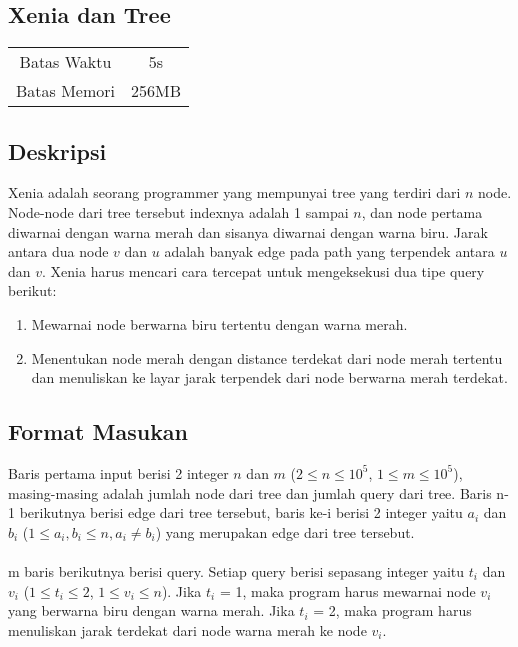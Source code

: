 \documentclass{article}
\begin{document}
\begin{center}

    
    \section*{Xenia dan Tree} %

    \begin{tabular}{ | c c | }
        \hline
        Batas Waktu  & 5s \\    %
        Batas Memori & 256MB \\  %
        \hline
    \end{tabular}
\end{center}

\subsection*{Deskripsi}
Xenia adalah seorang programmer yang mempunyai tree yang terdiri dari $n$ node. Node-node dari tree tersebut indexnya adalah 1 sampai $n$, dan node pertama diwarnai dengan warna merah dan sisanya diwarnai dengan warna biru. Jarak antara dua node $v$ dan $u$ adalah banyak edge pada path yang terpendek antara $u$ dan $v$.
Xenia harus mencari cara tercepat untuk mengeksekusi dua tipe query berikut:
\begin{enumerate}
    \setlength\itemsep{0pt}
    \item Mewarnai node berwarna biru tertentu dengan warna merah.
    \item Menentukan node merah dengan distance terdekat dari node merah tertentu dan menuliskan ke layar jarak terpendek dari node berwarna merah terdekat.
\end{enumerate}
\subsection*{Format Masukan}
Baris pertama  input berisi 2 integer $n$ dan $m$ ($2 \leq n \leq 10^5$, $1 \leq m \leq 10^5$), masing-masing adalah jumlah node dari tree dan jumlah query dari tree. Baris n-1 berikutnya berisi edge dari tree tersebut, baris ke-i berisi 2 integer yaitu $a_i$ dan $b_i$ ($1 \leq a_i, b_i \leq n, a_i \neq b_i$) yang merupakan edge dari tree tersebut.
\\
\\
m baris berikutnya berisi query. Setiap query berisi sepasang integer yaitu $t_i$ dan $v_i$ ($1 \leq t_i \leq 2$, $1 \leq v_i \leq n$). Jika $t_i$ = 1, maka program harus mewarnai node $v_i$ yang berwarna biru dengan warna merah. Jika $t_i$ = 2, maka program harus menuliskan jarak terdekat dari node warna merah ke node $v_i$.
\end{document}
